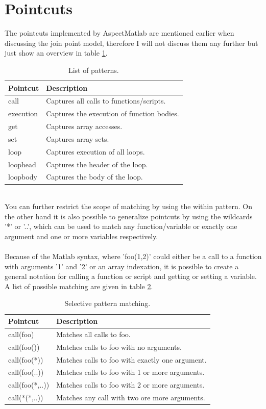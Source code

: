 \documentclass[a4paper]{report}
\begin{document}
\section{Pointcuts}
The pointcuts implemented by AspectMatlab are mentioned earlier when discussing the join point model, therefore I will not discuss them any further but just show an overview in table \ref{tab:Matlab_Patterns}.\\
\begin{table}
\centering
\begin{tabular}{l|l}
\hline
Pointcut & Description\\
\hline
\hline
call & Captures all calls to functions/scripts.\\
execution & Captures the execution of function bodies.\\
get & Captures array accesses.\\
set & Captures array sets.\\
loop & Captures execution of all loops.\\
loophead & Captures the header of the loop.\\
loopbody & Captures the body of the loop.\\
\hline
\end{tabular}
\caption{List of patterns.}
\label{tab:Matlab_Patterns}
\end{table}\\
You can further restrict the scope of matching by using the within pattern. On the other hand it is also possible to generalize pointcuts by using the wildcards '*' or '..', which can be used to match any function/variable or exactly one argument and one or more variables respectively.\\
\\
Because of the Matlab syntax, where 'foo(1,2)' could either be a call to a function with arguments '1' and '2' or an array indexation, it is possible to create a general notation for calling a function or script and getting or setting a variable. A list of possible matching are given in table \ref{tab:Matlab_PatternExamples}.\\
\begin{table}
\centering
\begin{tabular}{l|l}
\hline
Pointcut & Description\\
\hline
\hline
call(foo) & Matches all calls to foo.\\
call(foo()) & Matches calls to foo with no arguments.\\
call(foo(*)) & Matches calls to foo with exactly one argument.\\
call(foo(..)) & Matches calls to foo with 1 or more arguments.\\
call(foo(*,..)) & Matches calls to foo with 2 or more arguments.\\
call(*(*,..)) & Matches any call with two ore more arguments.\\
\hline
\end{tabular}
\caption{Selective pattern matching.}
\label{tab:Matlab_PatternExamples}
\end{table}\\
\end{document}
